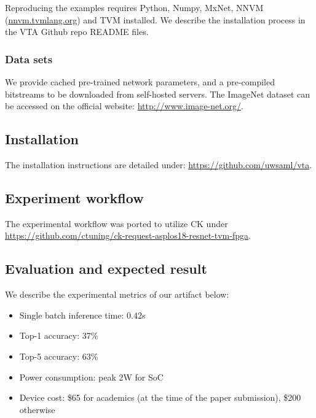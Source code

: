 \documentclass[sigconf]{acmart}
\begin{document}
Reproducing the examples requires Python, Numpy, MxNet, NNVM (\url{nnvm.tvmlang.org}) and TVM installed. We describe the installation process in the VTA Github repo README files.

\subsubsection{Data sets}

We provide cached pre-trained network parameters, and a pre-compiled bitstreams to be downloaded from self-hosted servers. 
The ImageNet dataset can be accessed on the official website: \url{http://www.image-net.org/}.

\subsection{Installation}

The installation instructions are detailed under: \url{https://github.com/uwsaml/vta}.

\subsection{Experiment workflow}

The experimental workflow was ported to utilize CK under \url{https://github.com/ctuning/ck-request-asplos18-resnet-tvm-fpga}.

\subsection{Evaluation and expected result}
We describe the experimental metrics of our artifact below:
\begin{itemize}
\item Single batch inference time: 0.42s
\item Top-1 accuracy: 37\%
\item Top-5 accuracy: 63\%
\item Power consumption: peak 2W for SoC
\item Device cost: \$65 for academics (at the time of the paper submission), \$200 otherwise
\end{itemize}

\end{document}
